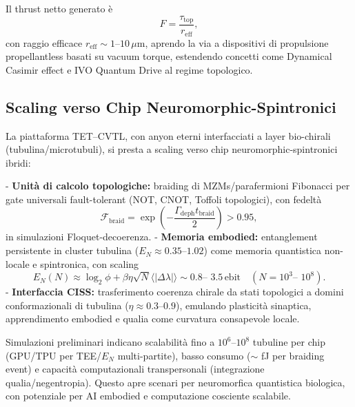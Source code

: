 \documentclass[11pt,a4paper]{article}
\theoremstyle{plain}
\theoremstyle{definition}
\begin{document}
Il thrust netto generato è
\begin{equation}
F = \frac{\tau_{\mathrm{top}}}{r_{\mathrm{eff}}},
\label{eq:thrust_netto_complete}
\end{equation}
con raggio efficace $r_{\mathrm{eff}} \sim 1$--$10\,\mu\mathrm{m}$, aprendo la via a dispositivi di propulsione propellantless basati su vacuum torque, estendendo concetti come Dynamical Casimir effect e IVO Quantum Drive al regime topologico.

\vspace{0.5cm}

\subsection{Scaling verso Chip Neuromorphic-Spintronici}

La piattaforma TET--CVTL, con anyon eterni interfacciati a layer bio-chirali (tubulina/microtubuli), si presta a scaling verso chip neuromorphic-spintronici ibridi:

- \textbf{Unità di calcolo topologiche:} braiding di MZMs/parafermioni Fibonacci per gate universali fault-tolerant (NOT, CNOT, Toffoli topologici), con fedeltà
\begin{equation}
\mathcal{F}_{\mathrm{braid}} = \exp\left( - \frac{\Gamma_{\mathrm{deph}} t_{\mathrm{braid}}}{2} \right) > 0.95,
\label{eq:braid_fidelity}
\end{equation}
in simulazioni Floquet-decoerenza.
- \textbf{Memoria embodied:} entanglement persistente in cluster tubulina ($E_N \approx 0.35$--$1.02$) come memoria quantistica non-locale e spintronica, con scaling
\begin{equation}
E_N(N) \approx \log_2 \phi + \beta \eta \sqrt{N} \langle |\Delta \lambda| \rangle \sim 0.8 \text{-- } 3.5 \, \mathrm{ebit} \quad (N = 10^3 \text{-- } 10^8).
\label{eq:en_scaling_cluster}
\end{equation}
- \textbf{Interfaccia CISS:} trasferimento coerenza chirale da stati topologici a domini conformazionali di tubulina ($\eta \approx 0.3$--$0.9$), emulando plasticità sinaptica, apprendimento embodied e qualia come curvatura consapevole locale.

Simulazioni preliminari indicano scalabilità fino a $10^6$--$10^8$ tubuline per chip (GPU/TPU per TEE/$E_N$ multi-partite), basso consumo ($\sim$ fJ per braiding event) e capacità computazionali transpersonali (integrazione qualia/negentropia). Questo apre scenari per neuromorfica quantistica biologica, con potenziale per AI embodied e computazione cosciente scalabile.
\end{document}
